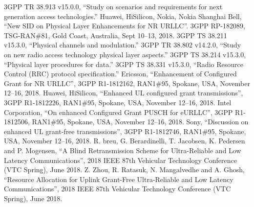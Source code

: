 \documentclass[conference]{IEEEtran}
\begin{document}
\begin{thebibliography}{00}
 3GPP TR 38.913 v15.0.0, ``Study on scenarios and requirements for next generation access technologies.''
 Huawei, HiSilicon, Nokia, Nokia Shanghai Bell, ``New SID on Physical Layer Enhancements for NR URLLC''. 3GPP RP-182089, TSG-RAN\#81, Gold Coast, Australia, Sept 10--13, 2018.
 3GPP TS 38.211 v15.3.0, ``Physical channels and modulation.''
 3GPP TR 38.802 v14.2.0, ``Study on new radio access technology physical layer aspects.''
 3GPP TS 38.214 v15.3.0, ``Physical layer procedures for data.''
 3GPP TS 38.331 v15.3.0, ``Radio Resource Control (RRC) protocol specification.''
 Ericsson, ``Enhancement of Configured Grant for NR URLLC'', 3GPP R1-1812162, RAN1\#95, Spokane, USA, November 12--16, 2018.
 Huawei, HiSilicon, ``Enhanced UL configured grant transmissions'', 3GPP R1-1812226, RAN1\#95, Spokane, USA, November 12--16, 2018.
 Intel Corporation, ``On enhanced Configured Grant PUSCH for eURLLC'', 3GPP R1-1812506, RAN1\#95, Spokane, USA, November 12--16, 2018.
 Sony, ``Discussion on enhanced UL grant-free transmissions'', 3GPP R1-1812746, RAN1\#95, Spokane, USA, November 12--16, 2018.
 R. breu, G. Berardinelli, T. Jacobsen, K. Pedersen and P. Mogensen, ``A Blind Retransmission Scheme for Ultra-Reliable and Low Latency Communications'', 2018 IEEE 87th Vehicular Technology Conference (VTC Spring), June 2018.
 Z. Zhou, R. Ratasuk, N. Mangalvedhe and A. Ghosh, ``Resource Allocation for Uplink Grant-Free Ultra-Reliable and Low Latency Communications'', 2018 IEEE 87th Vehicular Technology Conference (VTC Spring), June 2018.

\end{thebibliography}
\vspace{12pt}
\end{document}
